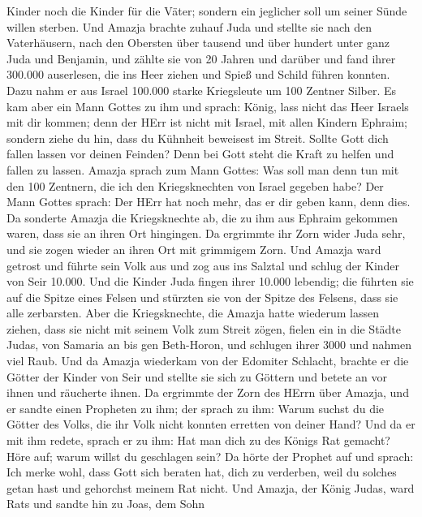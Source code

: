 Kinder noch die Kinder für die Väter; sondern ein jeglicher soll um
seiner Sünde willen sterben.  Und Amazja brachte zuhauf Juda
und stellte sie nach den Vaterhäusern, nach den Obersten über tausend
und über hundert unter ganz Juda und Benjamin, und zählte sie von 20
Jahren und darüber und fand ihrer 300.000 auserlesen, die ins Heer
ziehen und Spieß und Schild führen konnten.  Dazu nahm er
aus Israel 100.000 starke Kriegsleute um 100 Zentner Silber.
 Es kam aber ein Mann Gottes zu ihm und sprach: König, lass
nicht das Heer Israels mit dir kommen; denn der HErr ist nicht mit
Israel, mit allen Kindern Ephraim;  sondern ziehe du hin,
dass du Kühnheit beweisest im Streit. Sollte Gott dich fallen lassen vor
deinen Feinden? Denn bei Gott steht die Kraft zu helfen und fallen zu
lassen.  Amazja sprach zum Mann Gottes: Was soll man denn
tun mit den 100 Zentnern, die ich den Kriegsknechten von Israel gegeben
habe? Der Mann Gottes sprach: Der HErr hat noch mehr, das er dir geben
kann, denn dies.  Da sonderte Amazja die Kriegsknechte ab,
die zu ihm aus Ephraim gekommen waren, dass sie an ihren Ort hingingen.
Da ergrimmte ihr Zorn wider Juda sehr, und sie zogen wieder an ihren Ort
mit grimmigem Zorn.  Und Amazja ward getrost und führte
sein Volk aus und zog aus ins Salztal und schlug der Kinder von Seir
10.000.  Und die Kinder Juda fingen ihrer 10.000 lebendig;
die führten sie auf die Spitze eines Felsen und stürzten sie von der
Spitze des Felsens, dass sie alle zerbarsten.  Aber die
Kriegsknechte, die Amazja hatte wiederum lassen ziehen, dass sie nicht
mit seinem Volk zum Streit zögen, fielen ein in die Städte Judas, von
Samaria an bis gen Beth-Horon, und schlugen ihrer 3000 und nahmen viel
Raub.  Und da Amazja wiederkam von der Edomiter Schlacht,
brachte er die Götter der Kinder von Seir und stellte sie sich zu
Göttern und betete an vor ihnen und räucherte ihnen.  Da
ergrimmte der Zorn des HErrn über Amazja, und er sandte einen Propheten
zu ihm; der sprach zu ihm: Warum suchst du die Götter des Volks, die ihr
Volk nicht konnten erretten von deiner Hand?  Und da er mit
ihm redete, sprach er zu ihm: Hat man dich zu des Königs Rat gemacht?
Höre auf; warum willst du geschlagen sein? Da hörte der Prophet auf und
sprach: Ich merke wohl, dass Gott sich beraten hat, dich zu verderben,
weil du solches getan hast und gehorchst meinem Rat nicht. 
Und Amazja, der König Judas, ward Rats und sandte hin zu Joas, dem Sohn
